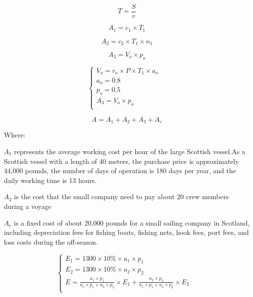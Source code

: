 \documentclass{mcmthesis}
\begin{document}
\begin{equation}\label{5}
T=\frac{S}{v}
\end{equation}


\begin{equation}\label{5}
A_1=c_1 \times T_1
\end{equation}

\begin{equation}\label{6}
A_2=c_2  \times T_1 \times n_1
\end{equation}

\begin{equation}\label{7}
A_3=V_o  \times p_o
\end{equation}

\begin{equation}
\left\{
\begin{array}{lr}
V_o=r_o \times P \times T_1 \times a_o &\\
a_o=0.8&\\
p_o=0.5&\\
A_3=V_o  \times p_o\\
\end{array}
\right.
\end{equation}





\begin{equation}\label{8}
A=A_1+A_2+A_3+A_e
\end{equation}

Where:

$A_1$ represents the average working cost per hour of the large Scottish vessel.As a Scottish vessel with a length of 40 meters, the purchase price is approximately 44,000 pounds, the number of days of operation is 180 days per year, and the daily working time is 13 hours.

$A_2$ is the cost that the small company need to pay about 20 crew members during a voyage

$A_e$ is a fixed cost of about 20,000 pounds for a small sailing company in Scotland, including depreciation fees for fishing boats, fishing nets, hook fees, port fees, and loss costs during the off-season.
 


\begin{equation}
\left\{
\begin{array}{lr}

E_1=1300 \times 10\% \times a_1 \times p_1 &\\
E_2=1300 \times 10\% \times a_2 \times p_2 &\\
E= \frac{a_1 \times p_1}{a_1 \times p_1+ a_2 \times p_2} \times E_1 + \frac{a_2 \times p_2}{a_1 \times p_1+ a_2 \times p_2} \times E_2\\

\end{array}
\right.
\end{equation}
\end{document}
